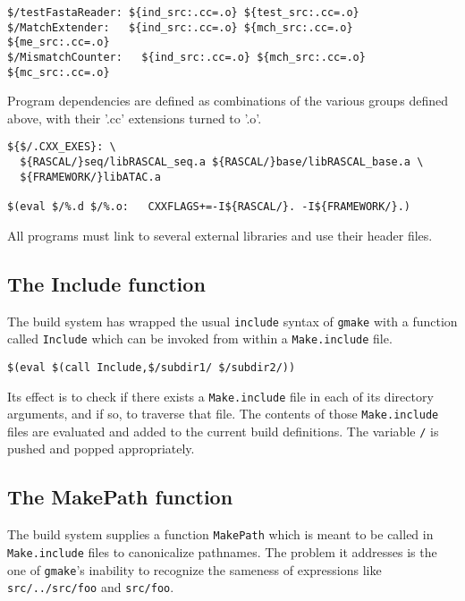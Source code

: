 \documentclass[letterpaper]{article}
\begin{document}
\begin{verbatim}
$/testFastaReader: ${ind_src:.cc=.o} ${test_src:.cc=.o}
$/MatchExtender:   ${ind_src:.cc=.o} ${mch_src:.cc=.o} ${me_src:.cc=.o} 
$/MismatchCounter:   ${ind_src:.cc=.o} ${mch_src:.cc=.o} ${mc_src:.cc=.o} 
\end{verbatim}
Program dependencies are defined as combinations of the various
groups defined above, with their '.cc' extensions turned to '.o'.

\begin{verbatim}
${$/.CXX_EXES}: \
  ${RASCAL/}seq/libRASCAL_seq.a ${RASCAL/}base/libRASCAL_base.a \
  ${FRAMEWORK/}libATAC.a

$(eval $/%.d $/%.o:   CXXFLAGS+=-I${RASCAL/}. -I${FRAMEWORK/}.)
\end{verbatim}
All programs must link to several external libraries and use their
header files.

\subsection{The Include function}

The build system has wrapped the usual \verb+include+ syntax of
\verb+gmake+ with a function called \verb+Include+ which can be
invoked from within a \verb+Make.include+ file.
\begin{verbatim}
$(eval $(call Include,$/subdir1/ $/subdir2/))
\end{verbatim}
Its effect is to check if there exists a \verb+Make.include+ file
in each of its directory arguments, and if so, to traverse that file.
The contents of those \verb+Make.include+ files are evaluated
and added to the current build definitions.  The variable \verb+/+ is pushed
and popped appropriately.

\subsection{The MakePath function}

The build system supplies a function \verb+MakePath+ which is
meant to be called in \verb+Make.include+ files to canonicalize pathnames.
The problem it addresses is the one of \verb+gmake+'s inability to recognize
the sameness of expressions like \verb+src/../src/foo+ and \verb+src/foo+.
\end{document}

